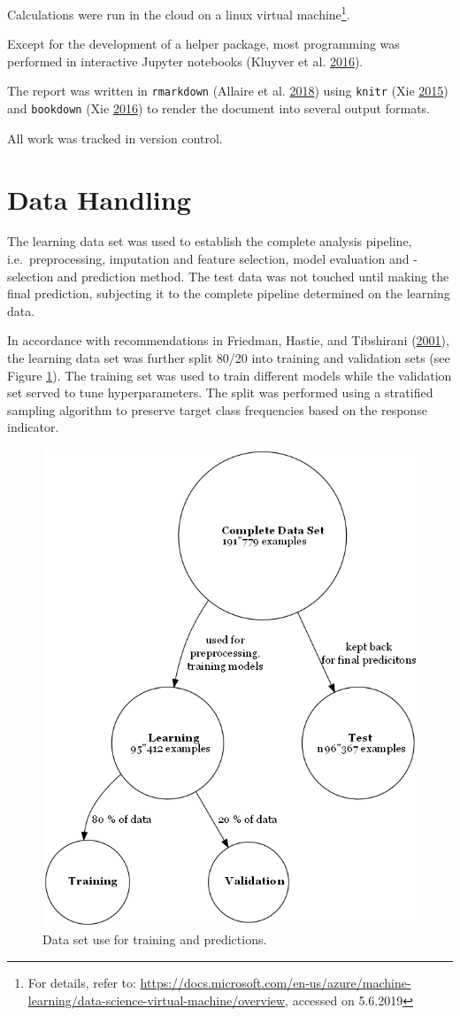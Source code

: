 \documentclass[
  11pt,
  a4paper,
  DIV=12,captions=tableheading,oneside,titlepage]{scrbook}
\begin{document}
Calculations were run in the cloud on a linux virtual machine\footnote{For details, refer to: \url{https://docs.microsoft.com/en-us/azure/machine-learning/data-science-virtual-machine/overview}, accessed on 5.6.2019}.

Except for the development of a helper package, most programming was performed in interactive Jupyter notebooks (Kluyver et al. \protect\hyperlink{ref-Kluyver:2016aa}{2016}).

The report was written in \texttt{rmarkdown} (Allaire et al. \protect\hyperlink{ref-allaire2016rmarkdown}{2018}) using \texttt{knitr} (Xie \protect\hyperlink{ref-xie2015}{2015}) and \texttt{bookdown} (Xie \protect\hyperlink{ref-xie2016bookdown}{2016}) to render the document into several output formats.

All work was tracked in version control.

\hypertarget{data-handling}{%
\section{Data Handling}\label{data-handling}}

The learning data set was used to establish the complete analysis pipeline, i.e.~preprocessing, imputation and feature selection, model evaluation and -selection and prediction method. The test data was not touched until making the final prediction, subjecting it to the complete pipeline determined on the learning data.

In accordance with recommendations in Friedman, Hastie, and Tibshirani (\protect\hyperlink{ref-friedman2001elements}{2001}), the learning data set was further split 80/20 into training and validation sets (see Figure \ref{fig:data-splitting}). The training set was used to train different models while the validation set served to tune hyperparameters. The split was performed using a stratified sampling algorithm to preserve target class frequencies based on the response indicator.

\begin{figure}

{\centering \includegraphics[width=0.5\linewidth]{figures/methods/data-splitting} 

}

\caption{Data set use for training and predictions.}\label{fig:data-splitting}
\end{figure}
\end{document}
